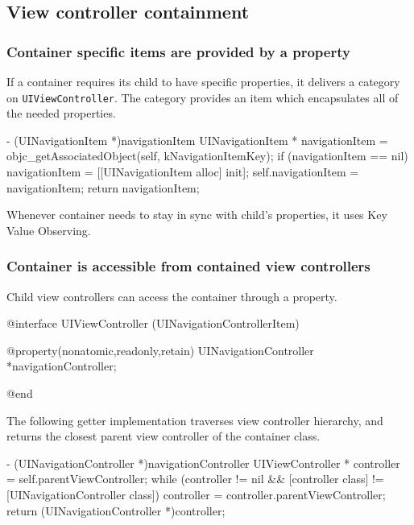 \documentclass[10pt]{extarticle}
\newcommand{\inlinecode}[1]{{\textcolor{TundoraColor}{\texttt{#1}}}}
\begin{document}
\subsection{View controller containment}


\subsubsection{Container specific items are provided by a property}


If a container requires its child to have specific properties, it delivers a category on \inlinecode{UIViewController}. The category provides an item which encapsulates all of the needed properties.

\begin{codelisting}
- (UINavigationItem *)navigationItem
{
    UINavigationItem * navigationItem = objc_getAssociatedObject(self, kNavigationItemKey);
    if (navigationItem == nil) {
        navigationItem = [[UINavigationItem alloc] init];
        self.navigationItem = navigationItem;
    }
    return navigationItem;
}
\end{codelisting}

Whenever container needs to stay in sync with child's properties, it uses Key Value Observing.


\subsubsection{Container is accessible from contained view controllers}

Child view controllers can access the container through a property.

\begin{codelisting}
@interface UIViewController (UINavigationControllerItem)

@property(nonatomic,readonly,retain) UINavigationController *navigationController;

@end
\end{codelisting}

The following getter implementation traverses view controller hierarchy, and returns the closest parent view controller of the container class.

\begin{codelisting}
- (UINavigationController *)navigationController
{
    UIViewController * controller = self.parentViewController;
    while (controller != nil && [controller class] != [UINavigationController class]) {
        controller = controller.parentViewController;
    }
    return (UINavigationController *)controller;
}
\end{codelisting}
\end{document}
